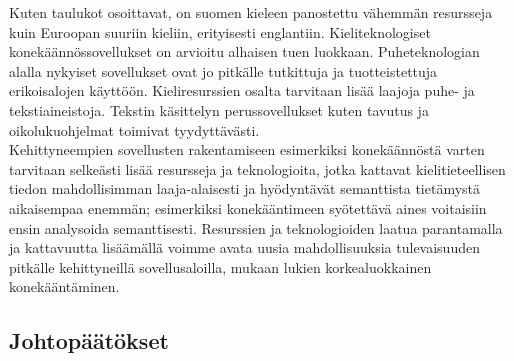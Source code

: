 \begin{multicols}{2}
Kuten taulukot osoittavat, on suomen kieleen panostettu vähemmän
resursseja kuin Euroopan suuriin kieliin, erityisesti
englantiin. Kieliteknologiset konekäännössovellukset on arvioitu
alhaisen tuen luokkaan. Puheteknologian alalla nykyiset sovellukset
ovat jo pitkälle tutkittuja ja tuotteistettuja erikoisalojen
käyttöön. Kieliresurssien osalta tarvitaan lisää laajoja puhe-
ja tekstiaineistoja. Tekstin käsittelyn perussovellukset kuten
tavutus ja oikolukuohjelmat toimivat tyydyttävästi.\\
Kehittyneempien sovellusten rakentamiseen esimerkiksi konekäännöstä
varten tarvitaan selkeästi lisää resursseja ja teknologioita, jotka
kattavat kielitieteellisen tiedon mahdollisimman laaja-alaisesti ja
hyödyntävät semanttista tietämystä aikaisempaa enemmän; esimerkiksi
konekääntimeen syötettävä aines voitaisiin ensin analysoida
semanttisesti. Resurssien ja teknologioiden laatua parantamalla ja
kattavuutta lisäämällä voimme avata uusia mahdollisuuksia
tulevaisuuden pitkälle kehittyneillä sovellusaloilla, mukaan lukien
korkealuokkainen konekääntäminen.


\subsection{Johtopäätökset}



\end{multicols}

